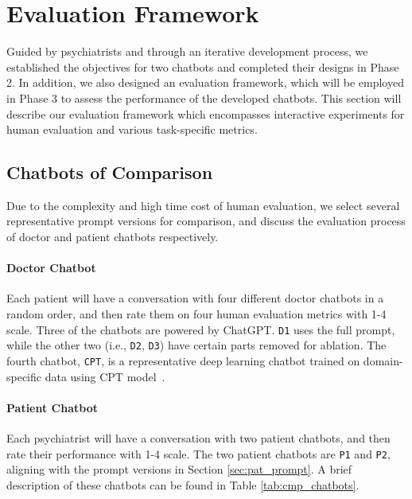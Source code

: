 \section{Evaluation Framework}
\label{sec:eval_frameworks}

Guided by psychiatrists and through an iterative development process, we established the objectives for two chatbots and completed their designs in Phase 2. In addition, we also designed an evaluation framework, which will be employed in Phase 3 to assess the performance of the developed chatbots. This section will describe our evaluation framework which encompasses interactive experiments for human evaluation and various task-specific metrics.
\subsection{Chatbots of Comparison}

Due to the complexity and high time cost of human evaluation, we select several representative prompt versions for comparison, and discuss the evaluation process of doctor and patient chatbots respectively.

\paragraph{Doctor Chatbot} 
Each patient will have a conversation with four different doctor chatbots in a random order, and then rate them on four human evaluation metrics with 1-4 scale. 
Three of the chatbots are powered by ChatGPT. \texttt{D1} uses the full prompt, 
while the other two (i.e., \texttt{D2}, 
\texttt{D3}) have certain parts removed for ablation. 
The fourth chatbot, \texttt{CPT}, is a representative deep learning chatbot trained on domain-specific data \cite{yao-etal-2022-d4} using CPT model~\cite{shao2021cpt}. 
\paragraph{Patient Chatbot}
Each psychiatrist will have a conversation with two patient chatbots, and then rate their performance with 1-4 scale. 
The two patient chatbots are \texttt{P1} and \texttt{P2}, aligning with the prompt versions in Section \ref{sec:pat_prompt}. 
A brief description of these chatbots can be found in Table \ref{tab:cmp_chatbots}.

